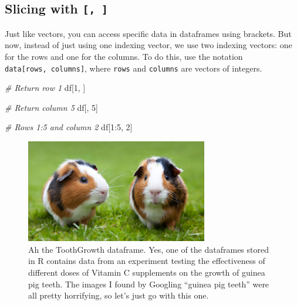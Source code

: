 \documentclass[]{book}
\newenvironment{Shaded}{\begin{snugshade}}{\end{snugshade}}
\newcommand{\DecValTok}[1]{\textcolor[rgb]{0.00,0.00,0.81}{{#1}}}
\newcommand{\CommentTok}[1]{\textcolor[rgb]{0.56,0.35,0.01}{\textit{{#1}}}}
\newcommand{\NormalTok}[1]{{#1}}
\theoremstyle{definition}
\theoremstyle{definition}
\theoremstyle{remark}
\begin{document}
\subsection{\texorpdfstring{Slicing with
\texttt{{[},\ {]}}}{Slicing with {[}, {]}}}\label{slicing-with}

Just like vectors, you can access specific data in dataframes using
brackets. But now, instead of just using one indexing vector, we use two
indexing vectors: one for the rows and one for the columns. To do this,
use the notation \texttt{data{[}rows,\ columns{]}}, where \texttt{rows}
and \texttt{columns} are vectors of integers.

\begin{Shaded}
\begin{Highlighting}[]
\CommentTok{# Return row 1}
\NormalTok{df[}\DecValTok{1}\NormalTok{, ]}

\CommentTok{# Return column 5}
\NormalTok{df[, }\DecValTok{5}\NormalTok{]}

\CommentTok{# Rows 1:5 and column 2}
\NormalTok{df[}\DecValTok{1}\NormalTok{:}\DecValTok{5}\NormalTok{, }\DecValTok{2}\NormalTok{]}
\end{Highlighting}
\end{Shaded}

\begin{figure}

{\centering \includegraphics[width=300px]{images/guineapig} 

}

\caption{Ah the ToothGrowth dataframe. Yes, one of the dataframes stored in R contains data from an experiment testing the effectiveness of different doses of Vitamin C supplements on the growth of guinea pig teeth. The images I found by Googling ``guinea pig teeth'' were all pretty horrifying, so let's just go with this one.}\label{fig:unnamed-chunk-192}
\end{figure}
\end{document}

